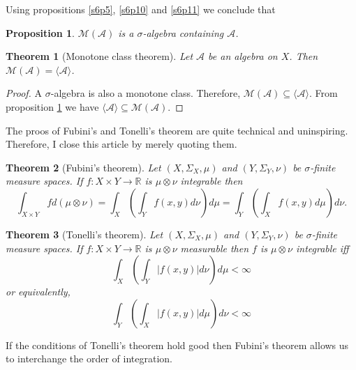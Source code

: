\documentclass{article}
\newcommand{\sor}{\mathbb{R}}
\theoremstyle{plain}
\newtheorem{thm}{Theorem}
\numberwithin{thm}{section}
\theoremstyle{plain}
\newtheorem{prop}{Proposition}
\numberwithin{prop}{section}
\theoremstyle{definition}
\numberwithin{defn}{section}
\theoremstyle{remark}
\theoremstyle{plain}
\numberwithin{cor}{section}
\numberwithin{equation}{section}
\begin{document}
Using propositions \ref{s6p5}, \ref{s6p10} and \ref{s6p11} we conclude that
\begin{prop}\label{s6p12}
$\mathcal{M}(\mathcal{A})$ is a $\sigma$-algebra containing $\mathcal{A}$.
\end{prop}

\begin{thm}[Monotone class theorem]\label{s6t1}
Let $\mathcal{A}$ be an algebra on $X$. Then $\mathcal{M}(\mathcal{A}) = \langle
\mathcal{A}\rangle$.
\end{thm}
\begin{proof}
A $\sigma$-algebra is also a monotone class. Therefore, $\mathcal{M}(\mathcal{A})
\subseteq \langle\mathcal{A}\rangle$. From proposition \ref{s6p12} we have $\langle
\mathcal{A}\rangle \subseteq \mathcal{M}(\mathcal{A})$.
\end{proof}

The proos of Fubini's and Tonelli's theorem are quite technical and uninspiring.
Therefore, I close this article by merely quoting them.
\begin{thm}[Fubini's theorem]\label{s6t2}
Let $(X, \Sigma_X, \mu)$ and $(Y, \Sigma_Y, \nu)$ be $\sigma$-finite measure 
spaces. If $f: X \times Y \rightarrow \sor$ is $\mu \otimes \nu$ integrable then
\[
\int_{X \times Y} fd(\mu\otimes\nu) = \int_X\left(\int_Y f(x, y)d\nu\right)d\mu = 
\int_Y\left(\int_X f(x, y)d\mu\right)d\nu.
\]
\end{thm}

\begin{thm}[Tonelli's theorem]\label{s6t3}
Let $(X, \Sigma_X, \mu)$ and $(Y, \Sigma_Y, \nu)$ be $\sigma$-finite measure 
spaces. If $f: X \times Y \rightarrow \sor$ is $\mu \otimes \nu$ measurable
then $f$ is $\mu\otimes\nu$ integrable iff
\[
\int_X\left(\int_Y |f(x, y)|d\nu\right)d\mu < \infty
\]
or equivalently,
\[
\int_Y\left(\int_X |f(x, y)|d\mu\right)d\nu < \infty
\]
\end{thm}
If the conditions of Tonelli's theorem hold good then Fubini's theorem allows us
to interchange the order of integration.
\end{document}

